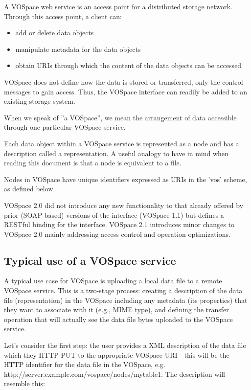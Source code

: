 \documentclass[11pt,a4paper]{ivoa}
\begin{document}
A VOSpace web service is an access point for a distributed storage network. Through this access point, a client can:

\begin{itemize}
    \item add or delete data objects
    \item manipulate metadata for the data objects
    \item obtain URIs through which the content of the data objects can be accessed
\end{itemize}
VOSpace does not define how the data is stored or transferred, only the control messages to gain access. Thus, the VOSpace interface can readily be added to an existing storage system.

When we speak of ''a VOSpace'', we mean the arrangement of data accessible through one particular VOSpace service.

Each data object within a VOSpace service is represented as a node and has a description called a representation. A useful analogy to have in mind when reading this document is that a node is equivalent to a file.

Nodes in VOSpace have unique identifiers expressed as URIs in the 'vos' scheme, as defined below.

VOSpace 2.0 did not introduce any new functionality to that already offered by prior (SOAP-based) versions of the interface (VOSpace 1.1) but defines a RESTful binding for the interface. VOSpace 2.1 introduces minor changes to VOSpace 2.0 mainly addressing access control and operation optimizations.

\subsection{Typical use of a VOSpace service}
\label{subsec:typical use of a vospace service}
A typical use case for VOSpace is uploading a local data file to a remote VOSpace service. This is a two-stage process: creating a description of the data file (representation) in the VOSpace including any metadata (its properties) that they want to associate with it (e.g., MIME type), and defining the transfer operation that will actually see the data file bytes uploaded to the VOSpace service.

Let's consider the first step: the user provides a XML description of the data file which they HTTP PUT to the appropriate VOSpace URI - this will be the HTTP identifier for the data file in the VOSpace, e.g. http://server.example.com/vospace/nodes/mytable1. The description will resemble this:
\end{document}
